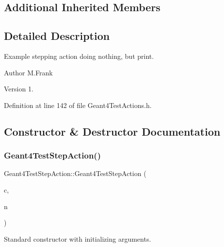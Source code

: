 \subsection*{Additional Inherited Members}


\subsection{Detailed Description}
Example stepping action doing nothing, but print. 

\begin{DoxyAuthor}{Author}
M.\+Frank 
\end{DoxyAuthor}
\begin{DoxyVersion}{Version}
1. 
\end{DoxyVersion}


Definition at line 142 of file Geant4\+Test\+Actions.\+h.



\subsection{Constructor \& Destructor Documentation}
\hypertarget{class_d_d4hep_1_1_simulation_1_1_test_1_1_geant4_test_step_action_af4446b1635ed2c17bee1b7c074f3924d}{}\label{class_d_d4hep_1_1_simulation_1_1_test_1_1_geant4_test_step_action_af4446b1635ed2c17bee1b7c074f3924d} 
\subsubsection{\texorpdfstring{Geant4\+Test\+Step\+Action()}{Geant4TestStepAction()}}
{\footnotesize\ttfamily Geant4\+Test\+Step\+Action\+::\+Geant4\+Test\+Step\+Action (\begin{DoxyParamCaption}\item[{\hyperlink{class_d_d4hep_1_1_simulation_1_1_geant4_context}{Geant4\+Context} $\ast$}]{c,  }\item[{const std\+::string \&}]{n }\end{DoxyParamCaption})}



Standard constructor with initializing arguments. 



